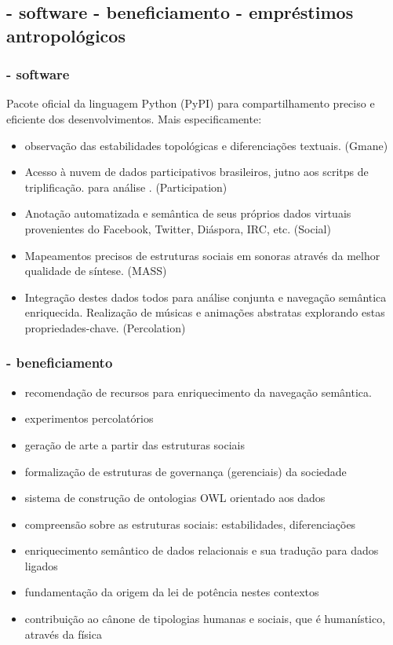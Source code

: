 \documentclass[10pt]{beamer}
\begin{document}
\begin{frame}
\subsection{- software \;\; - beneficiamento \;\; - empréstimos antropológicos}
\frametitle{- software}
Pacote oficial da linguagem Python (PyPI) para compartilhamento
preciso e eficiente dos desenvolvimentos. Mais especificamente:
	\begin{itemize}
		\item observação das estabilidades topológicas e diferenciações textuais. (Gmane)
		\item Acesso à nuvem de dados participativos brasileiros, jutno aos scritps de triplificação. para análise . (Participation)
		\item Anotação automatizada e semântica de seus próprios dados virtuais provenientes do Facebook, Twitter, Diáspora, IRC, etc. (Social)
		\item Mapeamentos precisos de estruturas sociais em sonoras através da melhor qualidade de síntese. (MASS)
		\item Integração destes dados todos para análise conjunta e navegação semântica enriquecida. Realização de músicas e animações abstratas explorando estas propriedades-chave. (Percolation)
	\end{itemize}
\end{frame}

\begin{frame}
\frametitle{- beneficiamento}
\begin{itemize}
	\item recomendação de recursos para enriquecimento da navegação semântica.
	\item experimentos percolatórios
	\item geração de arte a partir das estruturas sociais
	\item formalização de estruturas de governança (gerenciais) da sociedade
	\item sistema de construção de ontologias OWL orientado aos dados
	\item compreensão sobre as estruturas sociais: estabilidades, diferenciações
	\item enriquecimento semântico de dados relacionais e sua tradução para dados ligados
	\item fundamentação da origem da lei de potência nestes contextos
	\item contribuição ao cânone de tipologias humanas e sociais, que é humanístico, através da física
\end{itemize}
\end{frame}
\end{document}
